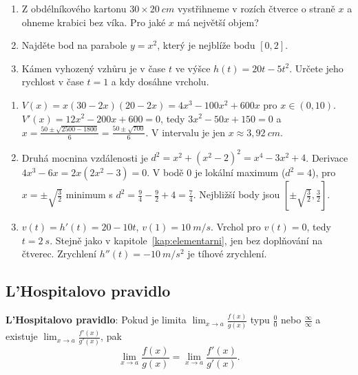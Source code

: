 \begin{problem}
  \begin{enumerate}[label=(\alph*)]
    \item Z obdélníkového kartonu $30\times 20\ \si{cm}$ vystřihneme v rozích čtverce o straně $x$ a ohneme krabici bez víka. Pro jaké $x$ má největší objem?
    \item Najděte bod na parabole $y = x^2$, který je nejblíže bodu $[0, 2]$.
    \item Kámen vyhozený vzhůru je v čase $t$ ve výšce $h(t) = 20t - 5t^2$. Určete jeho rychlost v čase $t = 1$ a kdy dosáhne vrcholu.
  \end{enumerate}
\end{problem}

\begin{solution}
  \begin{enumerate}[label=(\alph*)]
    \item $V(x) = x(30 - 2x)(20 - 2x) = 4x^3 - 100x^2 + 600x$ pro $x\in(0, 10)$. $V'(x) = 12x^2 - 200x + 600 = 0$, tedy $3x^2 - 50x + 150 = 0$ a $x = \frac{50\pm\sqrt{2500 - 1800}}{6} = \frac{50\pm\sqrt{700}}{6}$. V intervalu je jen $x\approx 3{,}92\ \si{cm}$.
    \item Druhá mocnina vzdálenosti je $d^2 = x^2 + {(x^2 - 2)}^2 = x^4 - 3x^2 + 4$. Derivace $4x^3 - 6x = 2x(2x^2 - 3) = 0$. V bodě $0$ je lokální maximum ($d^2 = 4$), pro $x = \pm\sqrt{\frac{3}{2}}$ minimum s $d^2 = \frac{9}{4} - \frac{9}{2} + 4 = \frac{7}{4}$. Nejbližší body jsou $\left[\pm\sqrt{\frac{3}{2}}, \frac{3}{2}\right]$.
    \item $v(t) = h'(t) = 20 - 10t$, $v(1) = 10\ \si{m/s}$. Vrchol pro $v(t) = 0$, tedy $t = 2\ \si{s}$. Stejně jako v kapitole~\ref{kap:elementarni}, jen bez doplňování na čtverec. Zrychlení $h''(t) = -10\ \si{m/s^2}$ je tíhové zrychlení.
  \end{enumerate}
\end{solution}

\subsection{L'Hospitalovo pravidlo}\label{sec:lhospital}

\begin{definitionbox}
  \textbf{L'Hospitalovo pravidlo}: Pokud je limita $\lim_{x\to a}\frac{f(x)}{g(x)}$ typu $\frac{0}{0}$ nebo $\frac{\infty}{\infty}$ a existuje $\lim_{x\to a}\frac{f'(x)}{g'(x)}$, pak
  \begin{equation*}
    \lim_{x\to a}\frac{f(x)}{g(x)} = \lim_{x\to a}\frac{f'(x)}{g'(x)}.
  \end{equation*}
\end{definitionbox}

